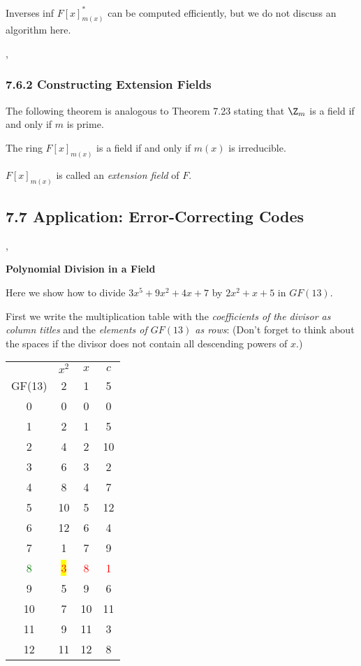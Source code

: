 \Com Inverses inf $F[x]^*_{m(x)}$ can be computed efficiently, but we do not
discuss an algorithm here.

\sep

\subsubsection*{7.6.2 Constructing Extension Fields}

The following theorem is analogous to Theorem 7.23 stating that $\Z_m$ is a
field if and only if $m$ is prime.

 The ring $F[x]_{m(x)}$ is a field if and only if $m(x)$ is
irreducible.

\Com $F[x]_{m(x)}$ is called an \emph{extension field} of $F$.


\subsection*{7.7 Application: Error-Correcting Codes}









\sep

\textbf{Polynomial Division in a Field}

Here we show how to divide $3x^5 + 9x^2+4x+7$ by $2x^2+x+5$ in $GF(13)$.

First we write the multiplication table with the \emph{coefficients of the
divisor as column titles} and the \emph{elements of $GF(13)$ as rows}: (Don't
forget to think about the spaces if the divisor does not contain all descending powers of $x$.)

\begin{tabular}{c|c|c|c}
   & $x^2$ & $x$ & $c$\\
GF(13)   & 2  &  1 &  5 \\
\hline
 0 &  0 &  0 &  0 \\
 1 &  2 &  1 &  5 \\
 2 &  4 &  2 & 10 \\
 3 &  6 &  3 &  2 \\
 4 &  8 &  4 &  7 \\
 5 & 10 &  5 & 12 \\
 6 & 12 &  6 &  4 \\
 7 &  1 &  7 &  9 \\
 
 \textcolor{green}{8} &  \colorbox{yellow}{\textcolor{red}{3}} & 
 \textcolor{red}{8} &
 \textcolor{red}{1}
 \\
 9 &  5 &  9 &  6 \\
10 &  7 & 10 & 11 \\
11 &  9 & 11 &  3 \\
12 & 11 & 12 &  8 \\
\end{tabular}


